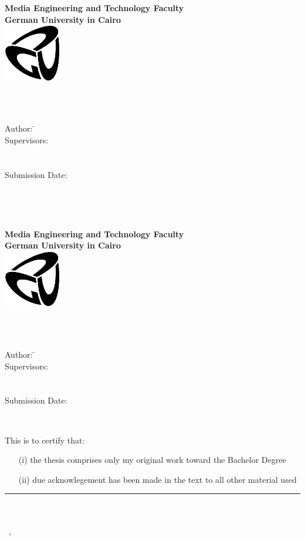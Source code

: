 \newcommand{\titlePage}{

\thispagestyle{empty}
\begin{center}
	\textbf{Media Engineering and Technology Faculty}\\[1mm]
	\textbf{German University in Cairo}\\[1mm]
	\includegraphics[width=2.5cm]{assets/images/GUC-logo-ss.eps}

	\vspace{2cm}
	\doublespacing
	{\Huge \textbf{\titleOfThesisOne}}\\
	\singlespacing
	\vspace{2cm}
	{\large \textbf{\typeOfThesis}}\\

	\vfill
	\parbox{1cm}{
  		\begin{large}
    			\begin{tabbing}
       			Author: \hspace{2cm}
        			\=\authorOfThesis\\[2mm]
      			Supervisors:
        			\>\supervisorOne\\[2mm]
				\>\supervisorTwo\\[2mm]
				\>\supervisorThree\\[2mm]
      			Submission Date:
        			\>\submissionDate\\
    			\end{tabbing}
  		\end{large}
	}\\
\end{center}
\clearpage
}
\titlePage
\thispagestyle{empty}\ \clearpage
\titlePage
\thispagestyle{empty}
This is to certify that:
\begin{itemize}
\item[(i)] the thesis comprises only my original work toward the Bachelor Degree
\item[(ii)] due acknowlegement has been made in the text to all other material used
\end{itemize}

\vspace{2cm}
\begin{flushright}
\rule[0mm]{6cm}{0.2mm}\\
\authorOfThesis\\
\submissionDay~\submissionMonth,~\submissionYear\\
\end{flushright}
\clearpage
